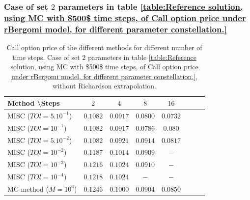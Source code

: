 \documentclass[11pt]{article}
\begin{document}
\FloatBarrier
\subsubsection{Case of set $2$ parameters in table \ref{table:Reference solution, using MC with $500$ time steps, of Call option price under rBergomi model, for different parameter constellation.}}
\label{sec:Case of set $2$ parameters}


\begin{table}[h!]
	\centering
	\begin{tabular}{l*{6}{c}r}
		Method \textbackslash  Steps            & $2$ & $4$ & $8$ & $16$  \\
		\hline
			MISC ($TOl=5.10^{-1}$)  & $0.1082$ & $0.0917$ & $0.0800$ & $0.0732$  \\
		MISC ($TOl=10^{-1}$)  & $0.1082$ & $0.0917$ & $0.0786$ & $0.080$  \\
			MISC ($TOl=5.10^{-2}$)  & $0.1082$ & $0.0921$ & $0.0914$ & $0.0817$  \\
		MISC ($TOl=10^{-2}$)  & $0.1187$ &  $0.1014$ & $0.0909$ & $-$  \\
		MISC ($TOl=10^{-3}$)        & $0.1216$ &$0.1024$ &  $0.0910$ &  $-$ \\
			MISC ($TOl=10^{-4}$)        & $0.1218$ &$0.1024$ &  $-$ &  $-$ \\
	\hline
		MC method ($M=10^{6}$)   & $0.1246 $  & $0.1000 $  & $0.0904$ & $0.0850 $ \\		
		\hline
	\end{tabular}
	\caption{ Call option price of the different methods for different number of time steps. Case of set $2$ parameters in table \ref{table:Reference solution, using MC with $500$ time steps, of Call option price under rBergomi model, for different parameter constellation.}, without Richardson extrapolation.}
	\label{table: Call option price of the different methods for different number of time steps. Case set 2}
\end{table}
\end{document}
